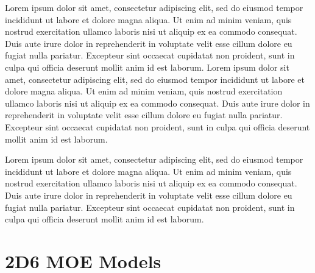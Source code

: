 Lorem ipsum dolor sit amet, consectetur adipiscing elit, sed do eiusmod tempor incididunt ut labore et dolore magna aliqua. Ut enim ad minim veniam, quis nostrud exercitation ullamco laboris nisi ut aliquip ex ea commodo consequat. Duis aute irure dolor in reprehenderit in voluptate velit esse cillum dolore eu fugiat nulla pariatur. Excepteur sint occaecat cupidatat non proident, sunt in culpa qui officia deserunt mollit anim id est laborum. Lorem ipsum dolor sit amet, consectetur adipiscing elit, sed do eiusmod tempor incididunt ut labore et dolore magna aliqua. Ut enim ad minim veniam, quis nostrud exercitation ullamco laboris nisi ut aliquip ex ea commodo consequat. Duis aute irure dolor in reprehenderit in voluptate velit esse cillum dolore eu fugiat nulla pariatur. Excepteur sint occaecat cupidatat non proident, sunt in culpa qui officia deserunt mollit anim id est laborum.

Lorem ipsum dolor sit amet, consectetur adipiscing elit, sed do eiusmod tempor incididunt ut labore et dolore magna aliqua. Ut enim ad minim veniam, quis nostrud exercitation ullamco laboris nisi ut aliquip ex ea commodo consequat. Duis aute irure dolor in reprehenderit in voluptate velit esse cillum dolore eu fugiat nulla pariatur. Excepteur sint occaecat cupidatat non proident, sunt in culpa qui officia deserunt mollit anim id est laborum.

\section{2D6 MOE Models}

